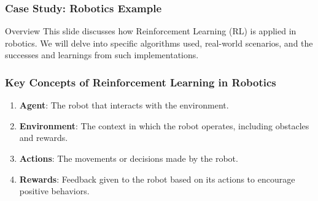 \documentclass[aspectratio=169]{beamer}
\begin{document}
\begin{frame}[fragile]
    \frametitle{Case Study: Robotics Example}
    \begin{block}{Overview}
        This slide discusses how Reinforcement Learning (RL) is applied in robotics. We will delve into specific algorithms used, real-world scenarios, and the successes and learnings from such implementations.
    \end{block}
\end{frame}

\begin{frame}[fragile]
    \frametitle{Key Concepts of Reinforcement Learning in Robotics}
    \begin{enumerate}
        \item \textbf{Agent}: The robot that interacts with the environment.
        \item \textbf{Environment}: The context in which the robot operates, including obstacles and rewards.
        \item \textbf{Actions}: The movements or decisions made by the robot.
        \item \textbf{Rewards}: Feedback given to the robot based on its actions to encourage positive behaviors.
    \end{enumerate}
\end{frame}
\end{document}
